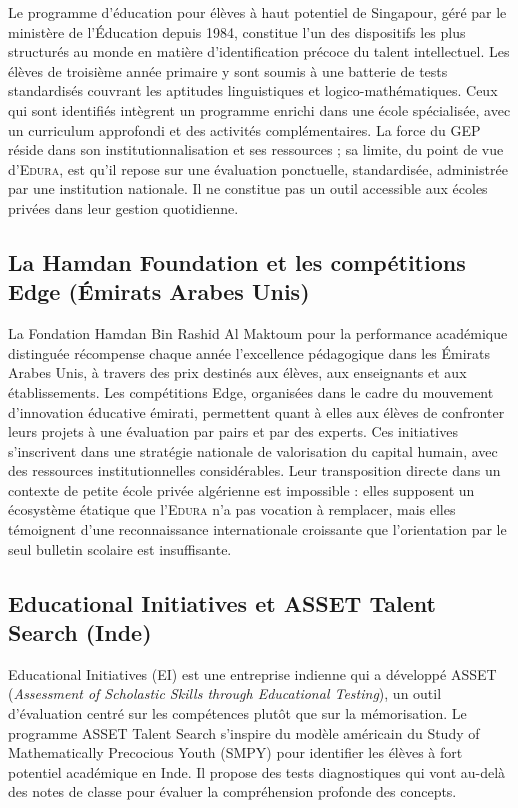 \documentclass[12pt,a4paper,oneside]{report}
\newcommand{\edura}{\textsc{Edura}}
\begin{document}
Le programme d'éducation pour élèves à haut potentiel de Singapour, géré par le ministère de l'Éducation depuis 1984, constitue l'un des dispositifs les plus structurés au monde en matière d'identification précoce du talent intellectuel. Les élèves de troisième année primaire y sont soumis à une batterie de tests standardisés couvrant les aptitudes linguistiques et logico-mathématiques. Ceux qui sont identifiés intègrent un programme enrichi dans une école spécialisée, avec un curriculum approfondi et des activités complémentaires. La force du GEP réside dans son institutionnalisation et ses ressources ; sa limite, du point de vue d'\edura{}, est qu'il repose sur une évaluation ponctuelle, standardisée, administrée par une institution nationale. Il ne constitue pas un outil accessible aux écoles privées dans leur gestion quotidienne.

\subsection{La Hamdan Foundation et les compétitions Edge (Émirats Arabes Unis)}

La Fondation Hamdan Bin Rashid Al Maktoum pour la performance académique distinguée récompense chaque année l'excellence pédagogique dans les Émirats Arabes Unis, à travers des prix destinés aux élèves, aux enseignants et aux établissements. Les compétitions Edge, organisées dans le cadre du mouvement d'innovation éducative émirati, permettent quant à elles aux élèves de confronter leurs projets à une évaluation par pairs et par des experts. Ces initiatives s'inscrivent dans une stratégie nationale de valorisation du capital humain, avec des ressources institutionnelles considérables. Leur transposition directe dans un contexte de petite école privée algérienne est impossible : elles supposent un écosystème étatique que l'\edura{} n'a pas vocation à remplacer, mais elles témoignent d'une reconnaissance internationale croissante que l'orientation par le seul bulletin scolaire est insuffisante.

\subsection{Educational Initiatives et ASSET Talent Search (Inde)}

Educational Initiatives (EI) est une entreprise indienne qui a développé ASSET (\textit{Assessment of Scholastic Skills through Educational Testing}), un outil d'évaluation centré sur les compétences plutôt que sur la mémorisation. Le programme ASSET Talent Search s'inspire du modèle américain du Study of Mathematically Precocious Youth (SMPY) pour identifier les élèves à fort potentiel académique en Inde. Il propose des tests diagnostiques qui vont au-delà des notes de classe pour évaluer la compréhension profonde des concepts.
\end{document}
